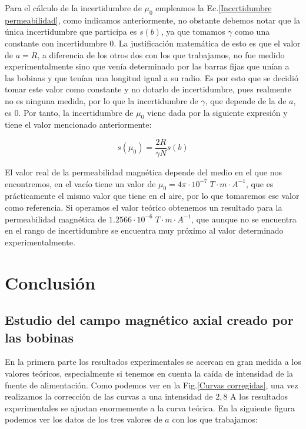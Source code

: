 \documentclass[a4paper,12pt,titlepage]{article}
\begin{document}
Para el cálculo de la incertidumbre de $\mu_0$ empleamos la Ec.\ref{Incertidumbre permeabilidad}, como indicamos anteriormente, no obstante debemos notar que la única incertidumbre que participa es $s(b)$, ya que tomamos $\gamma$ como una constante con incertidumbre 0. La justificación matemática de esto es que el valor de $a=R$, a diferencia de los otros dos con los que trabajamos, no fue medido experimentalmente sino que venía determinado por las barras fijas que unían a las bobinas y que tenían una longitud igual a su radio. Es por esto que se decidió tomar este valor como constante y no dotarlo de incertidumbre, pues realmente no es ninguna medida, por lo que la incertidumbre de $\gamma$, que depende de la de $a$, es 0. Por tanto, la incertidumbre de $\mu_0$ viene dada por la siguiente expresión y tiene el valor mencionado anteriormente:

\begin{equation}
    s(\mu_0) = \frac{2R}{\gamma N} s(b)
\end{equation}

El valor real de la permeabilidad magnética depende del medio en el que nos encontremos, en el vacío tiene un valor de $\mu_0=4\pi\cdot 10^{-7} \; T \cdot m \cdot A^{-1}$, que es prácticamente el mismo valor que tiene en el aire, por lo que tomaremos ese valor como referencia. Si operamos el valor teórico obtenemos un resultado para la permeabilidad magnética de $1.2566 \cdot 10^{-6}\; T \cdot m \cdot A^{-1}$, que aunque no se encuentra en el rango de incertidumbre se encuentra muy próximo al valor determinado experimentalmente.

\section{Conclusión}

\subsection{Estudio del campo magnético axial creado por las bobinas}

En la primera parte los resultados experimentales se acercan en gran medida a los valores teóricos, especialmente si tenemos en cuenta la caída de intensidad de la fuente de alimentación. Como podemos ver en la Fig.\ref{Curvas corregidas}, una vez realizamos la corrección de las curvas a una intensidad de $2,8$ A los resultados experimentales se ajustan enormemente a la curva teórica. En la siguiente figura podemos ver los datos de los tres valores de $a$ con los que trabajamos:
\end{document}
